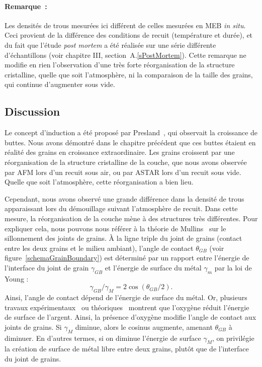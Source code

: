 \paragraph*{Remarque~:} Les densités de trous mesurées ici différent de celles mesurées en MEB \textit{in situ}. Ceci provient de la différence des conditions de recuit (température et durée), et du fait que l’étude \textit{post mortem} a été réalisée sur une série différente d’échantillons (voir chapitre III, section~A.\ref{sPostMortem}). Cette remarque ne modifie en rien l’observation d’une très forte réorganisation de la structure cristalline, quelle que soit l’atmosphère, ni la comparaison de la taille des grains, qui continue d’augmenter sous vide.\par 

		\subsection{Discussion}
Le concept d'induction a été proposé par Presland~\cite{presland1972hillock}, qui observait la croissance de buttes. Nous avons démontré dans le chapitre précédent que ces buttes étaient en réalité des grains en croissance extraordinaire. Les grains croissent par une réorganisation de la structure cristalline de la couche, que nous avons observée par AFM lors d’un recuit sous air, ou par ASTAR lors d’un recuit sous vide. Quelle que soit l’atmosphère, cette réorganisation a bien lieu.\par 
Cependant, nous avons observé une grande différence dans la densité de trous apparaissant lors du démouillage suivant l’atmosphère de recuit. Dans cette mesure, la réorganisation de la couche mène à des structures très différentes. Pour expliquer cela, nous pouvons nous référer à la théorie de Mullins~\cite{mullins1957theory} sur le sillonnement des joints de grains. À la ligne triple du joint de grains (contact entre les deux grains et le milieu ambiant), l’angle de contact $\theta_{GB}$ (voir figure~\ref{schemaGrainBoundary}) est déterminé par un rapport entre l’énergie de l’interface du joint de grain $\gamma_{GB}$ et l’énergie de surface du métal $\gamma_m$ par la loi de Young :
\begin{equation}
\gamma_{GB}/\gamma_M = 2\cos(\theta_{GB}/2).
\end{equation}
Ainsi, l’angle de contact dépend de l’énergie de surface du métal. Or, plusieurs travaux expérimentaux~\cite{buttner1952adsorption} ou théoriques~\cite{molina2011size} montrent que l’oxygène réduit l’énergie de surface de l’argent. Ainsi, la présence d’oxygène modifie l’angle de contact aux joints de grains. Si $\gamma_M$ diminue, alors le cosinus augmente, amenant $\theta_{GB}$ à diminuer. En d’autres termes, si on diminue l’énergie de surface $\gamma_M$, on privilégie la création de surface de métal libre entre deux grains, plutôt que de l’interface du joint de grains.\par 
